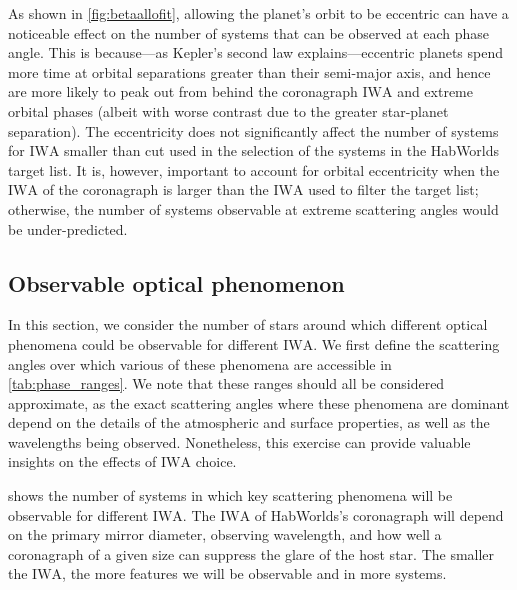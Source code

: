 \documentclass[
    usenatbib,
]{mnras}
\newcommand{\IWA}{\ensuremath{\mathrm{IWA}}}
\newcommand{\hwo}{HabWorlds}
\begin{document}
As shown in \cref{fig:betaallofit}, allowing the planet's orbit to be eccentric can have a noticeable effect on the number of systems that can be observed at each phase angle.
%
This is because---as Kepler's second law explains---eccentric planets spend more time at orbital separations greater than their semi-major axis, and hence are more likely to peak out from behind the coronagraph \IWA{} and extreme orbital phases (albeit with worse contrast due to the greater star-planet separation).
%
The eccentricity does not significantly affect the number of systems for \IWA{} smaller than cut used in the selection of the systems in the \hwo{} target list. 
It is, however, important to account for orbital eccentricity when the \IWA{} of the coronagraph is larger than the \IWA{} used to filter the target list; otherwise, the number of systems observable at extreme scattering angles would be under-predicted.


\subsection{Observable optical phenomenon}
\label{sec:results_scattering_phenomena}

In this section, we consider the number of stars around which different optical phenomena could be observable for different \IWA{}.
%
We first define the scattering angles over which various of these phenomena are accessible in \cref{tab:phase_ranges}.
%
We note that these ranges should all be considered approximate, as the exact scattering angles where these phenomena are dominant depend on the details of the atmospheric and surface properties, as well as the wavelengths being observed.
%
Nonetheless, this exercise can provide valuable insights on the effects of \IWA{} choice. 

 shows the number of systems in which key scattering phenomena will be observable for different \IWA{}.
%
The \IWA{} of \hwo's coronagraph will depend on the primary mirror diameter, observing wavelength, and how well a coronagraph of a given size can suppress the glare of the host star.
%
The smaller the \IWA{}, the more features we will be observable and in more systems. 
\end{document}
